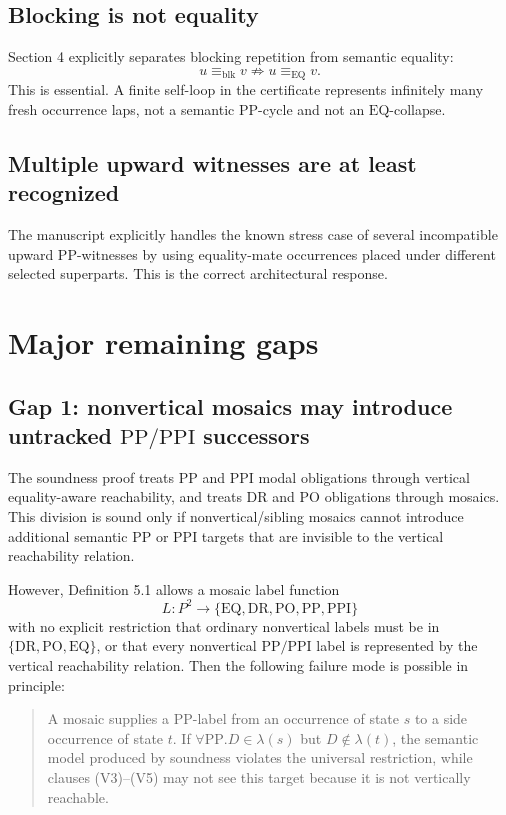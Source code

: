 \documentclass[11pt]{article}
\newcommand{\EQ}{\mathrm{EQ}}
\newcommand{\DR}{\mathrm{DR}}
\newcommand{\PO}{\mathrm{PO}}
\newcommand{\PP}{\mathrm{PP}}
\newcommand{\PPI}{\mathrm{PPI}}
\begin{document}
\subsection{Blocking is not equality}

Section 4 explicitly separates blocking repetition from semantic equality:
\[
 u\equiv_{\mathrm{blk}}v \not\Rightarrow u\equiv_{\EQ}v.
\]
This is essential.  A finite self-loop in the certificate represents infinitely many fresh occurrence laps, not a semantic \(\PP\)-cycle and not an \(\EQ\)-collapse.

\subsection{Multiple upward witnesses are at least recognized}

The manuscript explicitly handles the known stress case of several incompatible upward \(\PP\)-witnesses by using equality-mate occurrences placed under different selected superparts.  This is the correct architectural response.

\section{Major remaining gaps}

\subsection{Gap 1: nonvertical mosaics may introduce untracked \(\PP/\PPI\) successors}

The soundness proof treats \(\PP\) and \(\PPI\) modal obligations through vertical equality-aware reachability, and treats \(\DR\) and \(\PO\) obligations through mosaics.  This division is sound only if nonvertical/sibling mosaics cannot introduce additional semantic \(\PP\) or \(\PPI\) targets that are invisible to the vertical reachability relation.

However, Definition 5.1 allows a mosaic label function
\[
L:P^2\to \{\EQ,\DR,\PO,\PP,\PPI\}
\]
with no explicit restriction that ordinary nonvertical labels must be in \(\{\DR,\PO,\EQ\}\), or that every nonvertical \(\PP/\PPI\) label is represented by the vertical reachability relation.  Then the following failure mode is possible in principle:
\begin{quote}
A mosaic supplies a \(\PP\)-label from an occurrence of state \(s\) to a side occurrence of state \(t\).  If \(\forall\PP.D\in\lambda(s)\) but \(D\notin\lambda(t)\), the semantic model produced by soundness violates the universal restriction, while clauses (V3)--(V5) may not see this target because it is not vertically reachable.
\end{quote}
\end{document}
